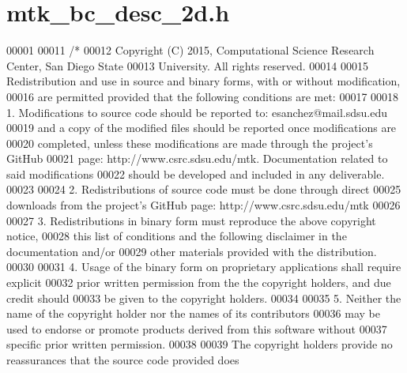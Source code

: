 \hypertarget{mtk__bc__desc__2d_8h_source}{\section{mtk\+\_\+bc\+\_\+desc\+\_\+2d.\+h}
\label{mtk__bc__desc__2d_8h_source}
}

\begin{DoxyCode}
00001 
00011 \textcolor{comment}{/*}
00012 \textcolor{comment}{Copyright (C) 2015, Computational Science Research Center, San Diego State}
00013 \textcolor{comment}{University. All rights reserved.}
00014 \textcolor{comment}{}
00015 \textcolor{comment}{Redistribution and use in source and binary forms, with or without modification,}
00016 \textcolor{comment}{are permitted provided that the following conditions are met:}
00017 \textcolor{comment}{}
00018 \textcolor{comment}{1. Modifications to source code should be reported to: esanchez@mail.sdsu.edu}
00019 \textcolor{comment}{and a copy of the modified files should be reported once modifications are}
00020 \textcolor{comment}{completed, unless these modifications are made through the project's GitHub}
00021 \textcolor{comment}{page: http://www.csrc.sdsu.edu/mtk. Documentation related to said modifications}
00022 \textcolor{comment}{should be developed and included in any deliverable.}
00023 \textcolor{comment}{}
00024 \textcolor{comment}{2. Redistributions of source code must be done through direct}
00025 \textcolor{comment}{downloads from the project's GitHub page: http://www.csrc.sdsu.edu/mtk}
00026 \textcolor{comment}{}
00027 \textcolor{comment}{3. Redistributions in binary form must reproduce the above copyright notice,}
00028 \textcolor{comment}{this list of conditions and the following disclaimer in the documentation and/or}
00029 \textcolor{comment}{other materials provided with the distribution.}
00030 \textcolor{comment}{}
00031 \textcolor{comment}{4. Usage of the binary form on proprietary applications shall require explicit}
00032 \textcolor{comment}{prior written permission from the the copyright holders, and due credit should}
00033 \textcolor{comment}{be given to the copyright holders.}
00034 \textcolor{comment}{}
00035 \textcolor{comment}{5. Neither the name of the copyright holder nor the names of its contributors}
00036 \textcolor{comment}{may be used to endorse or promote products derived from this software without}
00037 \textcolor{comment}{specific prior written permission.}
00038 \textcolor{comment}{}
00039 \textcolor{comment}{The copyright holders provide no reassurances that the source code provided does}

\end{DoxyCode}
